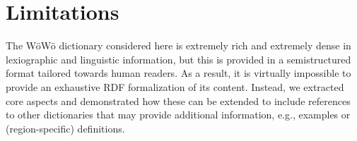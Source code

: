 \documentclass[11pt]{article}
\begin{document}
% 
%
%
%

\section*{Limitations}


The WöWö dictionary considered here is extremely rich and extremely dense in lexiographic and linguistic information, but this is provided in a semistructured format tailored towards human readers. As a result, it is virtually impossible to provide an exhaustive RDF formalization of its content. Instead, we extracted core aspects and demonstrated how these can be extended to include references to other dictionaries that may provide additional information, e.g., examples or (region-specific) definitions.
\end{document}
